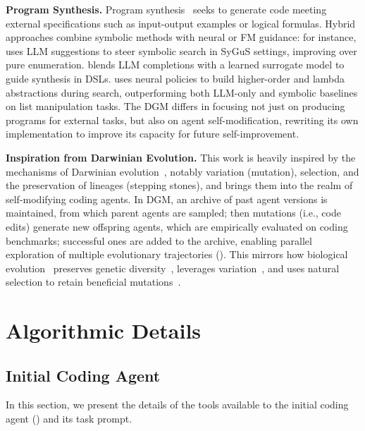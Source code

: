 \documentclass{article} %
\begin{document}
\textbf{Program Synthesis.}
Program synthesis~\citep{alur2018search, polozov2015flashmeta, buchi1990solving, gulwani2011automating, ellis2021dreamcoder} seeks to generate code meeting external specifications such as input-output examples or logical formulas. Hybrid approaches combine symbolic methods with neural or FM guidance: for instance, \citet{li2024guiding} uses LLM suggestions to steer symbolic search in SyGuS settings, improving over pure enumeration. \citet{barke2024hysynth} blends LLM completions with a learned surrogate model to guide synthesis in DSLs. \citet{shi2023lambdabeam} uses neural policies to build higher-order and lambda abstractions during search, outperforming both LLM-only and symbolic baselines on list manipulation tasks. The DGM differs in focusing not just on producing programs for external tasks, but also on agent self-modification, rewriting its own implementation to improve its capacity for future self-improvement.

\textbf{Inspiration from Darwinian Evolution.}
This work is heavily inspired by the mechanisms of Darwinian evolution~\citep{darwin2023origin}, notably variation (mutation), selection, and the preservation of lineages (stepping stones), and brings them into the realm of self-modifying coding agents. In DGM, an archive of past agent versions is maintained, from which parent agents are sampled; then mutations (i.e., code edits) generate new offspring agents, which are empirically evaluated on coding benchmarks; successful ones are added to the archive, enabling parallel exploration of multiple evolutionary trajectories (). This mirrors how biological evolution~\citep{edwards2000genetical, wright1932roles} preserves genetic diversity~\citep{mayr1982growth}, leverages variation~\citep{kimura1979neutral}, and uses natural selection to retain beneficial mutations~\citep{dobzhansky1970genetics}.

\section{Algorithmic Details}

\subsection{Initial Coding Agent}
\label{app:initial-agent}

In this section, we present the details of the tools available to the initial coding agent () and its task prompt.
\end{document}
